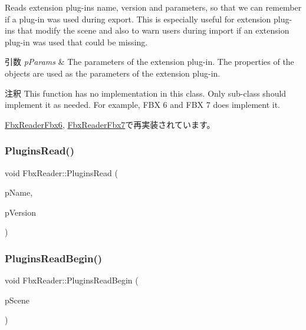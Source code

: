 Reads extension plug-\/ins name, version and parameters, so that we can remember if a plug-\/in was used during export. This is especially useful for extension plug-\/ins that modify the scene and also to warn users during import if an extension plug-\/in was used that could be missing. 
\begin{DoxyParams}{引数}
{\em p\+Params} & The parameters of the extension plug-\/in. The properties of the objects are used as the parameters of the extension plug-\/in. \\
\hline
\end{DoxyParams}
\begin{DoxyRemark}{注釈}
This function has no implementation in this class. Only sub-\/class should implement it as needed. For example, F\+BX 6 and F\+BX 7 does implement it. 
\end{DoxyRemark}


\hyperlink{class_fbx_reader_fbx6_a1a3544b766bd03dc4b1141ba4f93b03f}{Fbx\+Reader\+Fbx6}, \hyperlink{class_fbx_reader_fbx7_a60ceb6537da84cfd6540adde212b7b8f}{Fbx\+Reader\+Fbx7}で再実装されています。

\mbox{\label{class_fbx_reader_a72e6537a9823550e485243aa67a48bbd}} 
\subsubsection{\texorpdfstring{Plugins\+Read()}{PluginsRead()}}
{\footnotesize\ttfamily void Fbx\+Reader\+::\+Plugins\+Read (\begin{DoxyParamCaption}\item[{const char $\ast$}]{p\+Name,  }\item[{const char $\ast$}]{p\+Version }\end{DoxyParamCaption})\hspace{0.3cm}{\ttfamily [protected]}}

\mbox{\label{class_fbx_reader_a55e4e6db14fdee2454bb590551310b03}} 
\subsubsection{\texorpdfstring{Plugins\+Read\+Begin()}{PluginsReadBegin()}}
{\footnotesize\ttfamily void Fbx\+Reader\+::\+Plugins\+Read\+Begin (\begin{DoxyParamCaption}\item[{\hyperlink{class_fbx_scene}{Fbx\+Scene} \&}]{p\+Scene }\end{DoxyParamCaption})\hspace{0.3cm}{\ttfamily [protected]}}

